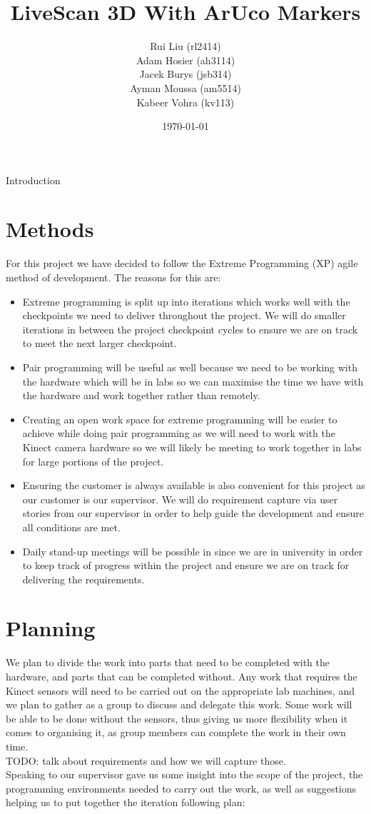 \documentclass[a4paper,12pt]{article}
\title{LiveScan 3D With ArUco Markers}
\author{Rui Liu (rl2414)\\Adam Hosier (ah3114)\\Jacek Burys (jsb314)\\Ayman Moussa (am5514)\\Kabeer Vohra (kv113)}
\date{\today}
\begin{document}
\maketitle
Introduction

\section*{Methods}
For this project we have decided to follow the Extreme Programming (XP) agile method of development. The reasons for this are:

\begin{itemize}
\item Extreme programming is split up into iterations which works well with the checkpoints we need to deliver throughout the project. We will do smaller iterations in between the project checkpoint cycles to ensure we are on track to meet the next larger checkpoint.
\item Pair programming will be useful as well because we need to be working with the hardware which will be in labs so we can maximise the time we have with the hardware and work together rather than remotely.
\item Creating an open work space for extreme programming will be easier to achieve while doing pair programming as we will need to work with the Kinect camera hardware so we will likely be meeting to work together in labs for large portions of the project.
\item Ensuring the customer is always available is also convenient for this project as our customer is our supervisor. We will do requirement capture via user stories from our supervisor in order to help guide the development and ensure all conditions are met.
\item Daily stand-up meetings will be possible in since we are in university in order to keep track of progress within the project and ensure we are on track for delivering the requirements.
\end{itemize}

\section*{Planning}
We plan to divide the work into parts that need to be completed with the hardware, and parts that can be completed without. Any work that requires the Kinect sensors will need to be carried out on the appropriate lab machines, and we plan to gather as a group to discuss and delegate this work. Some work will be able to be done without the sensors, thus giving us more flexibility when it comes to organising it, as group members can complete the work in their own time. \\
TODO: talk about requirements and how we will capture those. \\
Speaking to our supervisor gave us some insight into the scope of the project, the programming environments needed to carry out the work, as well as suggestions helping us to put together the iteration following plan:
\end{document}
